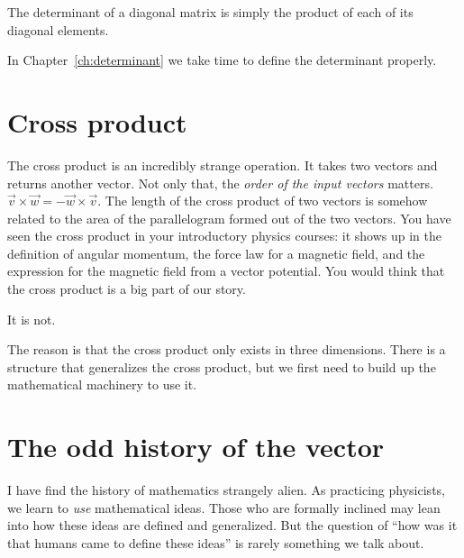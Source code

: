 \begin{subappendices}
\begin{example}\label{eg:determinant:of:diagonal}
The determinant of a diagonal matrix is simply the product of each of its diagonal elements. 
\end{example}

In Chapter~\ref{ch:determinant} we take time to define the determinant properly. 

\section{Cross product}

The cross product is an incredibly strange operation. It takes two vectors and returns another vector. Not only that, the \emph{order of the input vectors} matters. $\vec{v}\times\vec{w} = -\vec{w}\times\vec{v}$. The length of the cross product of two vectors is somehow related to the area of the parallelogram formed out of the two vectors. You have seen the cross product in your introductory physics courses: it shows up in the definition of angular momentum, the force law for a magnetic field, and the expression for the magnetic field from a vector potential. You would think that the cross product is a big part of our story. 

It is not.

The reason is that the cross product only exists in three dimensions. There is a structure that generalizes the cross product, but we first need to build up the mathematical machinery to use it. 

\section{The odd history of the vector}

I have find the history of mathematics strangely alien. As practicing physicists, we learn to \emph{use} mathematical ideas. Those who are formally inclined may lean into how these ideas are defined and generalized. But the question of ``how was it that humans came to define these ideas'' is rarely something we talk about.


\end{subappendices}
